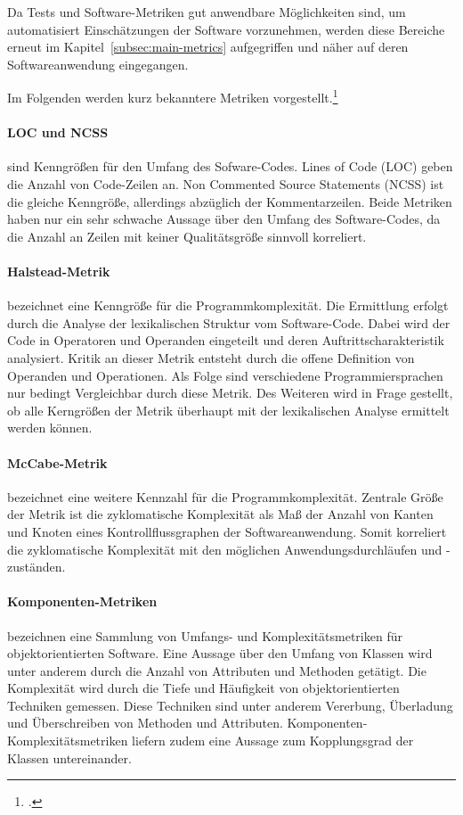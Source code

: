 Da Tests und Software-Metriken gut anwendbare Möglichkeiten sind, um automatisiert Einschätzungen der Software vorzunehmen, werden diese Bereiche erneut im Kapitel~\ref{subsec:main-metrics} \glqq {}\grqq{} aufgegriffen und näher auf deren Softwareanwendung eingegangen.

Im Folgenden werden kurz bekanntere Metriken vorgestellt.\footcite[S.249 ff][]{software-quality2008}

\paragraph{LOC und NCSS} sind Kenngrößen für den Umfang des Sofware-Codes. \glqq Lines of Code\grqq{} (LOC) geben die Anzahl von Code-Zeilen an. \glqq Non Commented Source Statements\grqq{} (NCSS) ist die gleiche Kenngröße, allerdings abzüglich der Kommentarzeilen. Beide Metriken haben nur ein sehr schwache Aussage über den Umfang des Software-Codes, da die Anzahl an Zeilen mit keiner Qualitätsgröße sinnvoll korreliert.

\paragraph{Halstead-Metrik} bezeichnet eine Kenngröße für die Programmkomplexität. Die Ermittlung erfolgt durch die Analyse der lexikalischen Struktur vom Software-Code. Dabei wird der Code in Operatoren und Operanden eingeteilt und deren Auftrittscharakteristik analysiert. Kritik an dieser Metrik entsteht durch die offene Definition von Operanden und Operationen. Als Folge sind verschiedene Programmiersprachen nur bedingt Vergleichbar durch diese Metrik. Des Weiteren wird in Frage gestellt, ob alle Kerngrößen der Metrik überhaupt mit der lexikalischen Analyse ermittelt werden können.

\paragraph{McCabe-Metrik} bezeichnet eine weitere Kennzahl für die Programmkomplexität. Zentrale Größe der Metrik ist die \glqq zyklomatische Komplexität\grqq{} als Maß der Anzahl von Kanten und Knoten eines Kontrollflussgraphen der Softwareanwendung. Somit korreliert die zyklomatische Komplexität mit den möglichen Anwendungsdurchläufen und -zuständen.

\paragraph{Komponenten-Metriken} bezeichnen eine Sammlung von Umfangs- und Komplexitätsmetriken für objektorientierten Software. Eine Aussage über den Umfang von Klassen wird unter anderem durch die Anzahl von Attributen und Methoden getätigt. Die Komplexität wird durch die Tiefe und Häufigkeit von objektorientierten Techniken gemessen. Diese Techniken sind unter anderem Vererbung, Überladung und Überschreiben von Methoden und Attributen. Komponenten-Komplexitätsmetriken liefern zudem eine Aussage zum Kopplungsgrad der Klassen untereinander.

